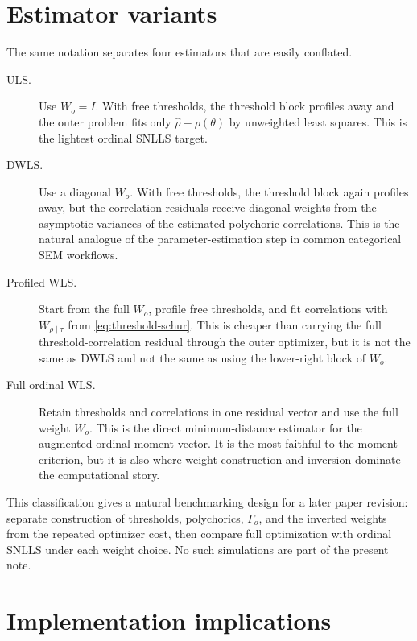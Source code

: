 \documentclass[11pt]{article}
\begin{document}
\section{Estimator variants}
\label{sec:variants}

The same notation separates four estimators that are easily conflated.

\begin{description}
\item[ULS.]
Use \(W_o=I\). With free thresholds, the threshold block profiles away and
the outer problem fits only \(\hat\rho-\rho(\theta)\) by unweighted least
squares. This is the lightest ordinal SNLLS target.

\item[DWLS.]
Use a diagonal \(W_o\). With free thresholds, the threshold block again
profiles away, but the correlation residuals receive diagonal weights from
the asymptotic variances of the estimated polychoric correlations. This is the
natural analogue of the parameter-estimation step in common categorical SEM
workflows.

\item[Profiled WLS.]
Start from the full \(W_o\), profile free thresholds, and fit correlations
with \(W_{\rho\mid\tau}\) from \eqref{eq:threshold-schur}. This is cheaper
than carrying the full threshold-correlation residual through the outer
optimizer, but it is not the same as DWLS and not the same as using the
lower-right block of \(W_o\).

\item[Full ordinal WLS.]
Retain thresholds and correlations in one residual vector and use the full
weight \(W_o\). This is the direct minimum-distance estimator for the
augmented ordinal moment vector. It is the most faithful to the moment
criterion, but it is also where weight construction and inversion dominate
the computational story.
\end{description}

This classification gives a natural benchmarking design for a later paper
revision: separate construction of thresholds, polychorics, \(\Gamma_o\), and
the inverted weights from the repeated optimizer cost, then compare full
optimization with ordinal SNLLS under each weight choice. No such simulations
are part of the present note.

\section{Implementation implications}
\label{sec:implementation}
\end{document}
